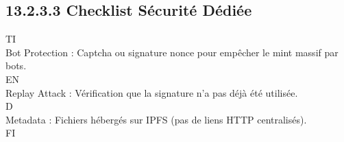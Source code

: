 \subsection{13.2.3.3 Checklist Sécurité Dédiée}
\vspace{0.5em}
\vspace{0.5em}
\vspace{0.5em}
\vspace{0.5em}
TI\\
Bot Protection : Captcha ou signature nonce pour empêcher le mint massif par bots.\\
\vspace{0.5em}
\vspace{0.5em}
\vspace{0.5em}
\vspace{0.5em}
EN\\
Replay Attack : Vérification que la signature n’a pas déjà été utilisée.\\
\vspace{0.5em}
\vspace{0.5em}
\vspace{0.5em}
\vspace{0.5em}
D\\
Metadata : Fichiers hébergés sur IPFS (pas de liens HTTP centralisés).\\
\vspace{0.5em}
\vspace{0.5em}
\vspace{0.5em}
\vspace{0.5em}
FI\\
